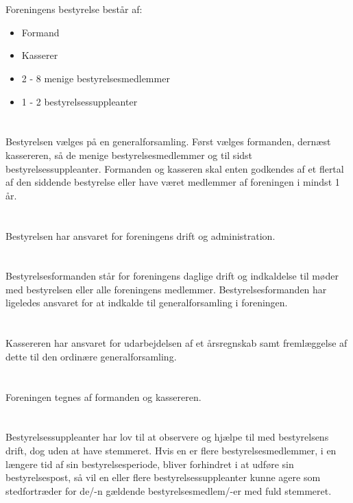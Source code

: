 \documentclass[danish,a4paper,twocolumn,oneside,article]{memoir}
\begin{document}
\section{} Foreningens bestyrelse består af:

\begin{itemize}
\item Formand
\item Kasserer
\item 2 - 8 menige bestyrelsesmedlemmer
\item 1 - 2 bestyrelsessuppleanter
\end{itemize}

\section{} Bestyrelsen vælges på en generalforsamling. Først vælges formanden, dernæst kassereren, så de menige 
bestyrelsesmedlemmer og til sidst bestyrelsessuppleanter. Formanden og kasseren skal enten godkendes af et flertal
af den siddende bestyrelse eller have været medlemmer af foreningen i mindst 1 år.

\section{} Bestyrelsen har ansvaret for foreningens drift og administration.

\section{} Bestyrelsesformanden står for foreningens daglige drift og indkaldelse til møder med bestyrelsen
eller alle foreningens medlemmer. Bestyrelsesformanden har ligeledes ansvaret for at indkalde til 
generalforsamling i foreningen.

\section{} Kassereren har ansvaret for udarbejdelsen af et årsregnskab samt fremlæggelse af dette til den
ordinære generalforsamling.

\section{} Foreningen tegnes af formanden og kassereren.

\section{} Bestyrelsessuppleanter har lov til at observere og hjælpe til med bestyrelsens drift, dog uden at have stemmeret. 
Hvis en er flere bestyrelsesmedlemmer, i en længere tid af sin bestyrelsesperiode, bliver forhindret i at udføre sin bestyrelsespost,
så vil en eller flere bestyrelsessuppleanter kunne agere som stedfortræder for de/-n gældende bestyrelsesmedlem/-er med fuld stemmeret.
\end{document}
